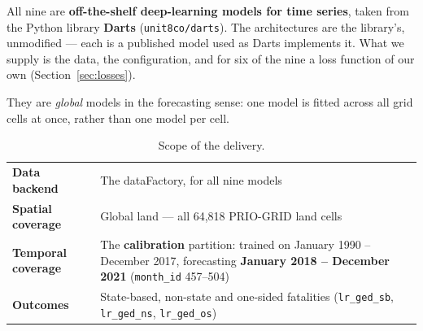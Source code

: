All nine are \textbf{off-the-shelf deep-learning models for time series}, taken from the Python
library \textbf{Darts} (\texttt{unit8co/darts}). The architectures are the library's, unmodified ---
each is a published model used as Darts implements it. What we supply is the data, the
configuration, and for six of the nine a loss function of our own (Section~\ref{sec:losses}).

They are \textit{global} models in the forecasting sense: one model is fitted across all grid cells
at once, rather than one model per cell.

\begin{table}[h!]
\centering
\renewcommand{\arraystretch}{1.3}
\caption{Scope of the delivery.}
\label{tab:scope}
\begin{tabular}{@{}p{3.6cm}p{10.4cm}@{}}
\toprule
\textbf{Data backend}      & The dataFactory, for all nine models \\
\textbf{Spatial coverage}  & Global land --- all 64,818 PRIO-GRID land cells \\
\textbf{Temporal coverage} & The \textbf{calibration} partition: trained on January 1990 --
                             December 2017, forecasting \textbf{January 2018 -- December 2021}
                             (\texttt{month\_id} 457--504) \\
\textbf{Outcomes}          & State-based, non-state and one-sided fatalities
                             (\texttt{lr\_ged\_sb}, \texttt{lr\_ged\_ns}, \texttt{lr\_ged\_os}) \\
\bottomrule
\end{tabular}
\end{table}
